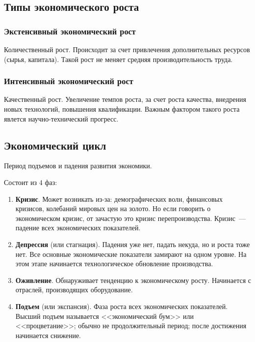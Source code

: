 \documentclass[12pt]{article}
\begin{document}
	\subsection{Типы экономического роста}
	
	\subsubsection{Экстенсивный экономический рост}
	
	\begin{definition}
		Количественный рост. Происходит за счет привлечения дополнительных ресурсов (сырья, капитала). Такой рост не меняет средняя производительность труда.
	\end{definition}
	
	\subsubsection{Интенсивный экономический рост}
	
	\begin{definition}
		Качественный рост. Увеличение темпов роста, за счет роста качества, внедрения новых технологий, повышения квалификации. Важным фактором такого роста явлется научно-технический прогресс.
	\end{definition}
	
	\subsection{Экономический цикл}
	
	\begin{definition}
		Период подъемов и падения развития экономики.
		
		Состоит из 4 фаз:
		\begin{enumerate}
			\item \textbf{Кризис}. Может возникать из-за: демографических волн, финансовых кризисов, колебаний мировых цен на золото. Но если говорить о экономическом кризис, от зачастую это кризис перепроизводства. Кризис~--- падение всех экономических показателей.
			\item \textbf{Депрессия} (или стагнация). Падения уже нет, падать некуда, но и роста тоже нет. Все основные экономические показатели замирают на одном уровне. На этом этапе начинается технологическое обновление производства.
			\item \textbf{Оживление}. Обнаруживает тенденцию к экономическому росту. Начинается с отраслей, производящих оборудование.
			\item \textbf{Подъем} (или экспансия). Фаза роста всех экономических показателей. Высший подъем называется <<экономический бум>> или <<процветание>>; обычно не продолжительный период; после достижения начинается снижение.
		\end{enumerate}
	\end{definition}
	
\end{document}
